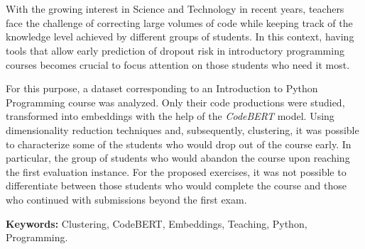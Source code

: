 \chapter*{\runtitulo}
\noindent With the growing interest in Science and Technology in recent years, teachers face the challenge of correcting large volumes of code while keeping track of the knowledge level achieved by different groups of students. In this context, having tools that allow early prediction of dropout risk in introductory programming courses becomes crucial to focus attention on those students who need it most.

For this purpose, a dataset corresponding to an Introduction to Python Programming course was analyzed. Only their code productions were studied, transformed into embeddings with the help of the \emph{CodeBERT} model. Using dimensionality reduction techniques and, subsequently, clustering, it was possible to characterize some of the students who would drop out of the course early. In particular, the group of students who would abandon the course upon reaching the first evaluation instance. For the proposed exercises, it was not possible to differentiate between those students who would complete the course and those who continued with submissions beyond the first exam.
\bigskip

\noindent\textbf{Keywords:} Clustering, CodeBERT, Embeddings, Teaching, Python, Programming.